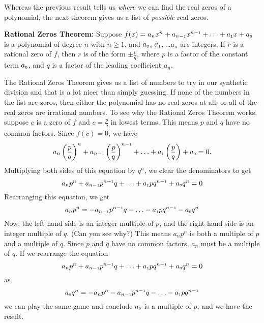 Whereas the previous result tells us \textit{where} we can find the real zeros of a polynomial, the next theorem gives us a list of \textit{possible} real zeros.

\begin{tcolorbox}

\begin{thm} \label{RZT}\textbf{Rational Zeros Theorem:}  Suppose $f(x) = a_{n} x^{n} + a_{n-\mbox{\tiny$1$}}x^{n-\mbox{\tiny$1$}} + \ldots + a_{\mbox{\tiny$1$}} x + a_{\mbox{\tiny$0$}}$ is a polynomial of degree $n$ with $n \geq 1$, and $a_{\mbox{\tiny$0$}}$, $a_{\mbox{\tiny$1$}}$, \ldots $a_{n}$ are integers.  If $r$ is a rational zero of $f$, then $r$ is of the form $\pm \frac{p}{q}$, where $p$ is a factor of the constant term $a_{\mbox{\tiny$0$}}$, and $q$ is a factor of the leading coefficient $a_{n}$.  
\end{thm}

\end{tcolorbox}

The Rational Zeros Theorem gives us a list of numbers to try in our synthetic division and that is a lot nicer than simply guessing.  If none of the numbers in the list are zeros, then either the polynomial has no real zeros at all, or all of the real zeros are irrational numbers.  To see why the Rational Zeros Theorem works, suppose $c$ is a zero of $f$ and $c = \frac{p}{q}$ in lowest terms.  This means $p$ and $q$ have no common factors.  Since $f(c) = 0$, we have \[a_{n} \left(\frac{p}{q}\right)^{n} + a_{n-\mbox{\tiny$1$}}\left(\frac{p}{q}\right)^{n-\mbox{\tiny$1$}} + \ldots + a_{\mbox{\tiny$1$}} \left(\frac{p}{q}\right) + a_{\mbox{\tiny$0$}} = 0.\]  Multiplying both sides of this equation by $q^n$, we clear the denominators to get \[a_{n}p^{n} + a_{n-\mbox{\tiny$1$}}p^{n-\mbox{\tiny$1$}}q + \ldots + a_{\mbox{\tiny$1$}}p q^{n-\mbox{\tiny$1$}} + a_{\mbox{\tiny$0$}}q^n = 0\]  Rearranging this equation, we get  \[a_{n}p^{n} = -a_{n-\mbox{\tiny$1$}}p^{n-\mbox{\tiny$1$}}q - \ldots - a_{\mbox{\tiny$1$}}p q^{n-\mbox{\tiny$1$}} -a_{\mbox{\tiny$0$}}q^n\] Now, the left hand side is an integer multiple of $p$, and the right hand side is an integer multiple of $q$. (Can you see why?)  This means $a_{n}p^{n}$ is both a multiple of $p$ and a multiple of $q$.  Since $p$ and $q$ have no common factors, $a_{n}$ must be a multiple of $q$.  If we rearrange the equation \[a_{n}p^{n} + a_{n-\mbox{\tiny$1$}}p^{n-\mbox{\tiny$1$}}q + \ldots + a_{\mbox{\tiny$1$}}p q^{n-\mbox{\tiny$1$}} + a_{\mbox{\tiny$0$}}q^n = 0\] as \[a_{\mbox{\tiny$0$}}q^n = -a_{n}p^{n} - a_{n-\mbox{\tiny$1$}}p^{n-\mbox{\tiny$1$}}q - \ldots - a_{\mbox{\tiny$1$}}p q^{n-\mbox{\tiny$1$}}\] we can play the same game and conclude $a_{\mbox{\tiny$0$}}$ is a multiple of $p$, and we have the result.

